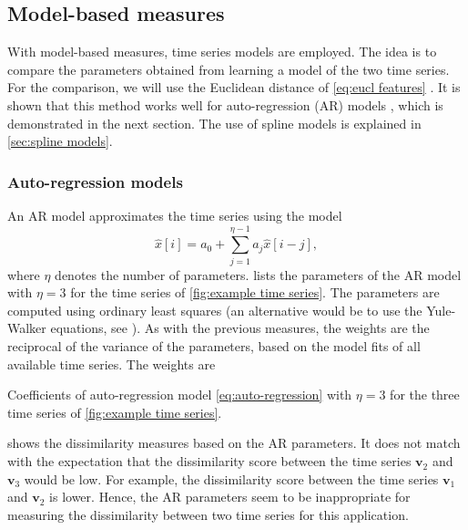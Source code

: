 \documentclass[10pt,final,a4paper,oneside,onecolumn]{article}
\newcommand{\profile}[1]{\textbf{v}_{#1}}
\theoremstyle{plain}\newtheorem{definition}{Definition}[section]    %
\theoremstyle{definition}\newtheorem{example}{Example}[section]     %
\theoremstyle{remark}\newtheorem{remarkenv}{Remark}[section]        %
\begin{document}
\subsection{Model-based measures}
\label{sec:model based}

With model-based measures, time series models are employed. The idea is to compare the parameters obtained from learning a model of the two time series. For the comparison, we will use the Euclidean distance of \cref{eq:eucl features} \cite{serra2014empirical}. It is shown that this method works well for auto-regression (AR) models \cite{piccolo1990distance, corduas2008autoregressive}, which is demonstrated in the next section. The use of spline models is explained in \cref{sec:spline models}.


\subsubsection{Auto-regression models}
\label{sec:auto regression models}
An AR model approximates the time series using the model 
\begin{equation}
	\label{eq:auto-regression}
	\hat{x}[i] = a_0 + \sum_{j=1}^{\eta-1} a_j \hat{x}[i-j],
\end{equation}
where $\eta$ denotes the number of parameters.  lists the parameters of the AR model with $\eta=3$ for the time series of \cref{fig:example time series}. The parameters are computed using ordinary least squares (an alternative would be to use the Yule-Walker equations, see \cite{gardner1988spectral}). As with the previous measures, the weights are the reciprocal of the variance of the parameters, based on the model fits of all available time series. The weights are 

\begin{table}
	\centering
	\caption{Coefficients of auto-regression model \cref{eq:auto-regression} with $\eta=3$ for the three time series of \cref{fig:example time series}.}
	\label{tab:ar coefficients}
	
\end{table}

 shows the dissimilarity measures based on the AR parameters. It does not match with the expectation that the dissimilarity score between the time series $\profile{2}$ and $\profile{3}$ would be low. For example, the dissimilarity score between the time series $\profile{1}$ and $\profile{2}$ is lower. Hence, the AR parameters seem to be inappropriate for measuring the dissimilarity between two time series for this application.
\end{document}
